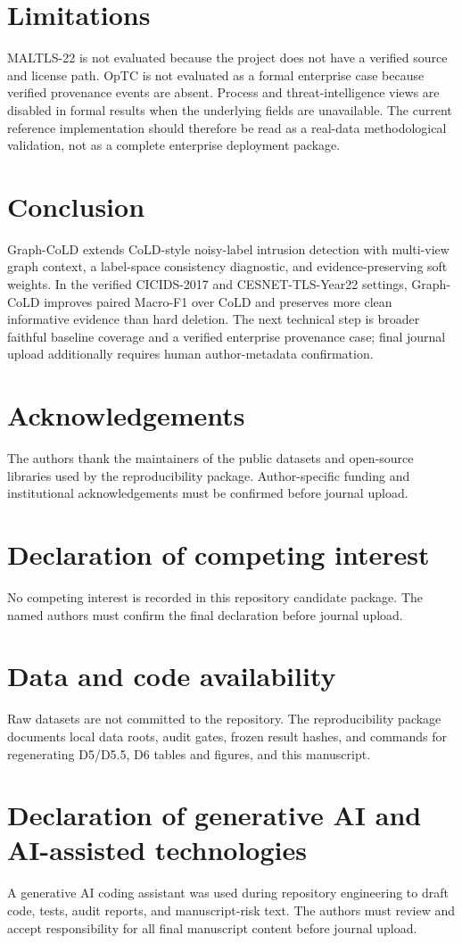 \documentclass[preprint,review,12pt]{elsarticle}
\begin{document}
\section{Limitations}
MALTLS-22 is not evaluated because the project does not have a verified source
and license path. OpTC is not evaluated as a formal enterprise case because
verified provenance events are absent. Process and threat-intelligence views are
disabled in formal results when the underlying fields are unavailable. The
current reference implementation should therefore be read as a real-data
methodological validation, not as a complete enterprise deployment package.

\section{Conclusion}
Graph-CoLD extends CoLD-style noisy-label intrusion detection with multi-view
graph context, a label-space consistency diagnostic, and evidence-preserving
soft weights. In the verified CICIDS-2017 and CESNET-TLS-Year22 settings,
Graph-CoLD improves paired Macro-F1 over CoLD and preserves more clean
informative evidence than hard deletion. The next technical step is broader faithful baseline coverage and a verified
enterprise provenance case; final journal upload additionally requires human
author-metadata confirmation.

\section*{Acknowledgements}
The authors thank the maintainers of the public datasets and open-source
libraries used by the reproducibility package. Author-specific funding and
institutional acknowledgements must be confirmed before journal upload.

\section*{Declaration of competing interest}
No competing interest is recorded in this repository candidate package. The named
authors must confirm the final declaration before journal upload.

\section*{Data and code availability}
Raw datasets are not committed to the repository. The reproducibility package
documents local data roots, audit gates, frozen result hashes, and commands for
regenerating D5/D5.5, D6 tables and figures, and this manuscript.

\section*{Declaration of generative AI and AI-assisted technologies}
A generative AI coding assistant was used during repository engineering to draft
code, tests, audit reports, and manuscript-risk text. The authors must review and
accept responsibility for all final manuscript content before journal upload.



\end{document}
